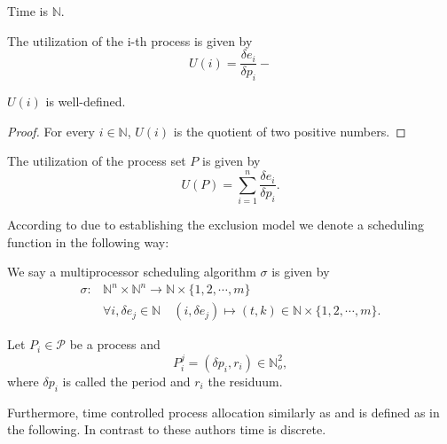 	\begin{definition}
		Time is $\mathbb{N}$.
	\end{definition}
	
	\begin{definition}
		The utilization of the i-th process is given by 
		\begin{equation} 
		U(i) = \frac{\delta e_i}{\delta p_i}- 
		\end{equation}
	\end{definition}
	\begin{lemma}
	$U(i)$ is well-defined.
	\end{lemma}
	\begin{proof}
	For every $i\in \mathbb{N}$, $U(i)$ is the quotient of two positive numbers.
	\end{proof}
	
	\begin{definition}
	The utilization of the process set $P$ is given by 
		\begin{equation}
		U(P)= \sum_{i=1}^n \frac{\delta e_i}{\delta p_i}.
		\end{equation}
	\end{definition}
	
	According to \cite{B97} due to establishing the exclusion model we denote  a scheduling function in the following way:
	
	\begin{definition}
	We say a multiprocessor scheduling algorithm $\sigma$ is given by 
		\begin{align} 
		\sigma: &\mathbb{N}^n \times \mathbb{N}^n \longrightarrow  \mathbb{N} \times \{1,2,\cdots, m\} \\
		&\forall i, \delta e_j \in  \mathbb{N} \quad (i ,\delta e_j)  \mapsto (t,k) \in \mathbb{N}\times \{1,2,\cdots,m\}. 
		\end{align}
	\end{definition}
	
	\begin{definition}
	Let $P_i\in \mathcal{P}$ be a process and 
	\begin{equation}
	P^j_i = ( \delta p_i, r_i) \in \mathbb{N}_o^2,  
	\end{equation}
	where $\delta p_i$ is called the period and $r_i$ the residuum. 
	\end{definition}
	Furthermore, time controlled process allocation similarly as \cite{B97} and \cite[p. 34]{K} is defined as in the following. In contrast to these authors time is discrete.
	
